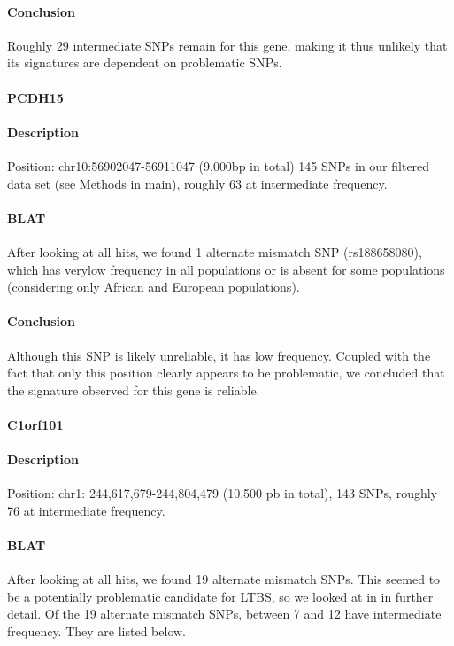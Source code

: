 \begin{refsection}
\begin{otherlanguage}{english}
\begin{footnotesize}
\paragraph{Conclusion} Roughly 29 intermediate SNPs remain for this gene, making it thus unlikely that its signatures are dependent on problematic SNPs.

\medskip

\paragraph{PCDH15}

\paragraph{Description} Position: chr10:56902047-56911047 (9,000bp in total)
145 SNPs in our filtered data set (see Methods in main), roughly 63 at intermediate frequency.

\paragraph{BLAT} After looking at all hits, we found 1 alternate mismatch SNP (rs188658080), which has verylow frequency in all populations or is absent for some populations (considering only African and European populations).

\paragraph{Conclusion} Although this SNP is likely unreliable, it has low frequency. Coupled with the fact that only this position clearly appears to be problematic, we concluded that the signature observed for this gene is reliable. 

\medskip

\paragraph{C1orf101}

\paragraph{Description} Position: chr1: 244,617,679-244,804,479 (10,500 pb in total), 143 SNPs, roughly 76 at intermediate frequency.

\paragraph{BLAT} After looking at all hits, we found 19 alternate mismatch SNPs. This seemed to be a potentially problematic candidate for LTBS, so we looked at in in further detail. Of the 19 alternate mismatch SNPs, between 7 and 12 have intermediate frequency. They are listed below.


\end{footnotesize}
\end{otherlanguage}
\end{refsection}
